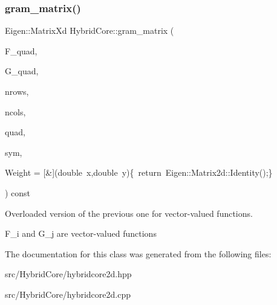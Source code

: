 \subsubsection{\texorpdfstring{gram\+\_\+matrix()}{gram\_matrix()}\hspace{0.1cm}{\footnotesize\ttfamily [2/2]}}
{\footnotesize\ttfamily Eigen\+::\+Matrix\+Xd Hybrid\+Core\+::gram\+\_\+matrix (\begin{DoxyParamCaption}\item[{const std\+::vector$<$ Eigen\+::\+Matrix\+Xd $>$ \&}]{F\+\_\+quad,  }\item[{const std\+::vector$<$ Eigen\+::\+Matrix\+Xd $>$ \&}]{G\+\_\+quad,  }\item[{const size\+\_\+t \&}]{nrows,  }\item[{const size\+\_\+t \&}]{ncols,  }\item[{const std\+::vector$<$ \hyperlink{structHArDCore2D_1_1HybridCore_1_1qrule}{Hybrid\+Core\+::qrule} $>$ \&}]{quad,  }\item[{const bool \&}]{sym,  }\item[{std\+::function$<$ Eigen\+::\+Matrix2d(double, double)$>$}]{Weight = {\ttfamily \mbox{[}\&\mbox{]}(double~x,double~y)\{~return~Eigen\+:\+:Matrix2d\+:\+:Identity();\}} }\end{DoxyParamCaption}) const}



Overloaded version of the previous one for vector-\/valued functions. 

F\+\_\+i and G\+\_\+j are vector-\/valued functions 

The documentation for this class was generated from the following files\+:\begin{DoxyCompactItemize}
\item 
src/\+Hybrid\+Core/hybridcore2d.\+hpp\item 
src/\+Hybrid\+Core/hybridcore2d.\+cpp\end{DoxyCompactItemize}
